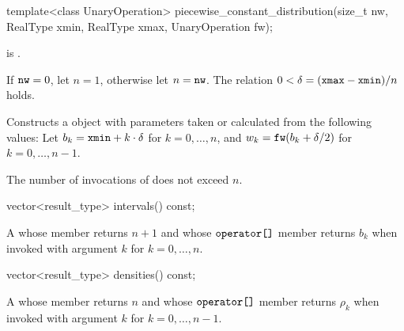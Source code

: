 %
\begin{itemdecl}
template<class UnaryOperation>
  piecewise_constant_distribution(size_t nw, RealType xmin, RealType xmax, UnaryOperation fw);
\end{itemdecl}

\begin{itemdescr}
\pnum
\mandates
{} is .

\pnum
\expects
 If $\tcode{nw} = 0$, let $n = 1$, otherwise let $n = \tcode{nw}$.
 The relation $0 < \delta = (\tcode{xmax} - \tcode{xmin}) / n$
 holds.

\pnum
\effects
Constructs a  object
 with parameters taken or calculated
 from the following values:
 Let $b_k = \tcode{xmin} + k \cdot \delta $ for $ k = 0, \dotsc, n$,
 and $w_k = \tcode{fw}(b_k + \delta / 2) $ for $ k = 0, \dotsc, n - 1$.

\pnum
\complexity
The number of invocations of  does not exceed $n$.
\end{itemdescr}

%
\begin{itemdecl}
vector<result_type> intervals() const;
\end{itemdecl}

\begin{itemdescr}
\pnum
\returns
A 
 whose  member returns $n + 1$
 and whose $ \tcode{operator[]} $ member returns $b_k$
 when invoked with argument $k$ for $k = 0, \dotsc, n $.
\end{itemdescr}

%
\begin{itemdecl}
vector<result_type> densities() const;
\end{itemdecl}

\begin{itemdescr}
\pnum
\returns
A 
 whose  member returns $n$
 and whose $ \tcode{operator[]} $ member returns $\rho_k$
 when invoked with argument $k$ for $k = 0, \dotsc, n - 1$.
\end{itemdescr}



